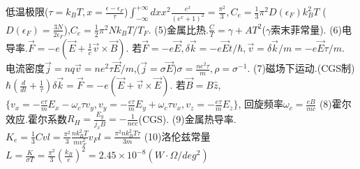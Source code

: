 \documentclass[UTF8,a4paper,1pt,twocolumn]{ctexart}
\begin{document}
\begin{itemize}
  低温极限($\tau=k_B T,x=\frac{\epsilon-\epsilon_F}{\tau}$)$\int_{-\infty}^{+\infty}dxx^2\frac{e^x}{(e^x +1)^2}=\frac{\pi^2}{3},C_e=\frac{1}{3}\pi^2D(\epsilon_F)k_B^2T$
  ($D(\epsilon_F)=\frac{3N}{2\epsilon_F}$),$C_e=\frac{1}{2}\pi^2Nk_BT/T_F$.
  (5)金属比热.$\frac{C}{T}=\gamma+AT^2$($\gamma$索末菲常量).
  (6)电导率.$\vec{F}=-e(\vec{E}+\frac{1}{c}\vec{v}\times\vec{B})$.
  若$\vec{F}=-e\vec{E},\delta\vec{k}=-e\vec{E}t/\hbar,\vec{v}=\delta\vec{k}/m=-e\vec{E}\tau/m$.
  电流密度$\vec{j}=nq\vec{v}=ne^2\tau\vec{E}/m$,($\vec{j}=\sigma\vec{E}$)$\sigma=\frac{ne^2\tau}{m},\rho=\sigma^{-1}$.
  (7)磁场下运动.(CGS制)$\hbar(\frac{d}{dt}+\frac{1}{\tau})\delta\vec{k}=\vec{F}=-e(\vec{E}+\vec{v}\times\vec{E})$.
  若$\vec{B}=B\hat{z}$,
  $\{v_x=-\frac{e\tau}{m}E_x-\omega_c\tau v_y,v_y=-\frac{e\tau}{m}E_y+\omega_c\tau v_x,v_z=-\frac{e\tau}{m}E_z\}$,
  回旋频率$\omega_c=\frac{eB}{mc}$
  (8)霍尔效应.霍尔系数$R_H=\frac{E_y}{j_x B}=-\frac{1}{nec}$(CGS).
  (9)金属热导率.$K_e=\frac{1}{3}Cvl=\frac{\pi^2}{3}\frac{nk_B^2T}{mv_F^2}v_Fl=\frac{\pi^2 n k_B^2 T\tau}{3m}$
  (10)洛伦兹常量$L=\frac{K}{\sigma T}=\frac{\pi^2}{3}(\frac{k_B}{e})^2=2.45\times 10^{-8}(W\cdot\Omega/deg^2)$


\end{itemize}
\end{document}
